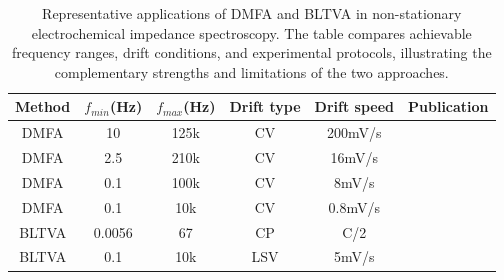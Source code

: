 \begin{table}[h]
    \centering
    \begin{tabular}{cccccc}
        \toprule
        Method & $f_{min}$(Hz) & $f_{max} $(Hz) & Drift type & Drift speed & Publication\\
        \midrule
        DMFA & 10 & 125k & CV & 200mV/s & \cite{erinmwingbovoDynamicImpedanceSpectroscopy2019}\\
        DMFA & 2.5 & 210k & CV & 16mV/s & \cite{erinmwingbovoEffectFilmThickness2023}\\
        DMFA & 0.1 & 100k & CV & 8mV/s & \cite{piantaEvaluationKineticParameters2023a}\\
        DMFA & 0.1 & 10k & CV & 0.8mV/s & \cite{scarpioniElectrochemicalImpedanceSpectroscopy2023a}\\
        \midrule
        BLTVA & 0.0056 & 67 & CP & C/2 & \cite{hallemansOperandoElectrochemicalImpedance2022}\\
        BLTVA & 0.1 & 10k & LSV & 5mV/s & \cite{dabirihavighOperandoORPEISMonitoring2025}\\
        \bottomrule
    \end{tabular}
    \caption{Representative applications of DMFA and BLTVA in non-stationary electrochemical impedance spectroscopy.
    The table compares achievable frequency ranges, drift conditions, and experimental protocols, illustrating the complementary strengths and limitations of the two approaches.}
    \label{tab:literature-parameters-dmfa-bltva}
\end{table}
